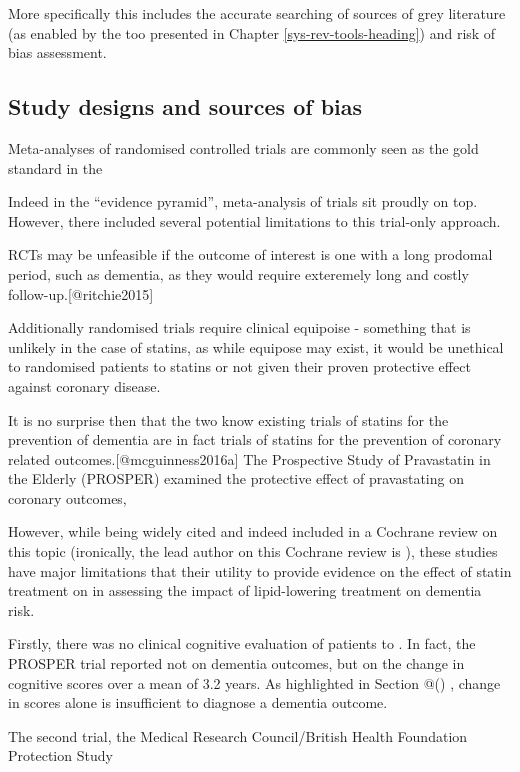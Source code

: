\documentclass[a4paper,nobind]{templates/ociamthesis}
\begin{document}
More specifically this includes the accurate searching of sources of grey literature (as enabled by the too presented in Chapter \ref{sys-rev-tools-heading}) and risk of bias assessment.

\hypertarget{study-designs-and-sources-of-bias}{%
\subsection{Study designs and sources of bias}\label{study-designs-and-sources-of-bias}}

Meta-analyses of randomised controlled trials are commonly seen as the gold standard in the

Indeed in the ``evidence pyramid'', meta-analysis of trials sit proudly on top. However, there included several potential limitations to this trial-only approach.

RCTs may be unfeasible if the outcome of interest is one with a long prodomal period, such as dementia, as they would require exteremely long and costly follow-up.{[}@ritchie2015{]}

Additionally randomised trials require clinical equipoise - something that is unlikely in the case of statins, as while equipose may exist, it would be unethical to randomised patients to statins or not given their proven protective effect against coronary disease.

It is no surprise then that the two know existing trials of statins for the prevention of dementia are in fact trials of statins for the prevention of coronary related outcomes.{[}@mcguinness2016a{]} The Prospective Study of Pravastatin in the Elderly (PROSPER) examined the protective effect of pravastating on coronary outcomes,

However, while being widely cited and indeed included in a Cochrane review on this topic (ironically, the lead author on this Cochrane review is ), these studies have major limitations that their utility to provide evidence on the effect of statin treatment on in assessing the impact of lipid-lowering treatment on dementia risk.

Firstly, there was no clinical cognitive evaluation of patients to . In fact, the PROSPER trial reported not on dementia outcomes, but on the change in cognitive scores over a mean of 3.2 years. As highlighted in Section @() , change in scores alone is insufficient to diagnose a dementia outcome.

The second trial, the Medical Research Council/British Health Foundation Protection Study
\end{document}
